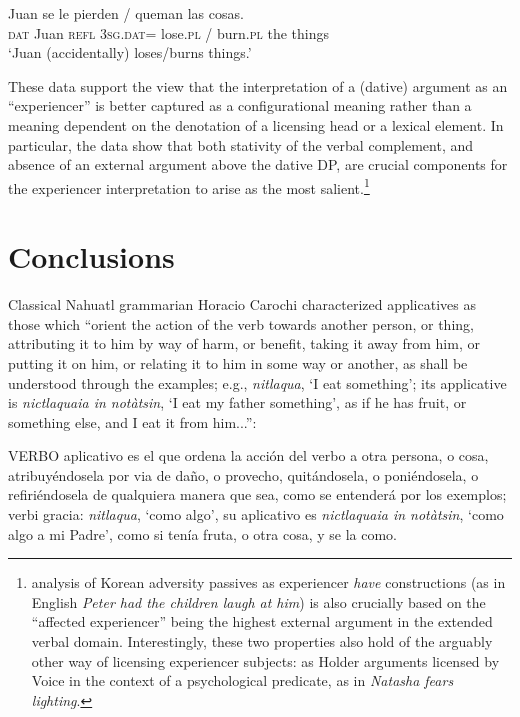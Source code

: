 \documentclass[output=paper,colorlinks,citecolor=brown,nonflat]{./langscibook}
\begin{document}
\ea%
    \label{ex:cuervo:22}
     {Juan} {se} {le} {pierden} / {queman} {las} {cosas}.\\
    \textsc{dat} Juan \textsc{refl} \textsc{3sg.dat}= lose.\textsc{pl} / burn.\textsc{pl}  the things\\
    \glt ‘Juan (accidentally) loses/burns things.’
    \z

These data support the view that the interpretation of a (dative) argument as an “experiencer” is better captured as a configurational meaning rather than a meaning dependent on the denotation of a licensing head or a lexical element. In particular, the data show that both stativity of the verbal complement, and absence of an external argument above the dative DP, are crucial components for the experiencer interpretation to arise as the most salient.\footnote{ analysis of Korean adversity passives as experiencer \textit{have} constructions (as in English \textit{Peter had the children laugh at him}) is also crucially based on the “affected experiencer” being the highest external argument in the extended verbal domain. Interestingly, these two properties also hold of the arguably other way of licensing experiencer subjects: as Holder arguments licensed by Voice in the context of a psychological predicate, as in \textit{Natasha fears lighting}.}

\section{Conclusions}\label{sec:cuervo:5}

Classical Nahuatl grammarian Horacio Carochi characterized applicatives as those which “orient the action of the verb towards another person, or thing, attributing it to him by way of harm, or benefit, taking it away from him, or putting it on him, or relating it to him in some way or another, as shall be understood through the examples; e.g., \textit{nitlaqua}, ‘I eat something’; its applicative is \textit{nictlaquaia in notàtsin}, ‘I eat my father something’, as if he has fruit, or something else, and I eat it from him...”:

VERBO aplicativo es el que ordena la acción del verbo a otra persona, o cosa, atribuyéndosela por via de daño, o provecho, quitándosela, o poniéndosela, o refiriéndosela de qualquiera manera que sea, como se entenderá por los exemplos; verbi gracia: \textit{nitlaqua}, ‘como algo’, su aplicativo es \textit{nictlaquaia in notàtsin}, ‘como algo a mi Padre’, como si tenía fruta, o otra cosa, y se la como. \citep[466]{Carochi1645}
\end{document}
